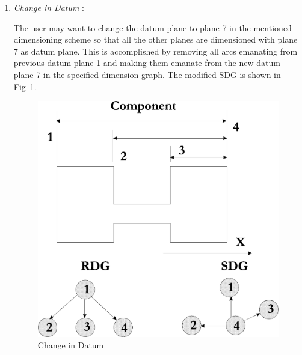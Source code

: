 \begin{enumerate}
                    When the input is given, the two selected primitives are
                    located in the RDG and are checked for connectedness to
                    ensure that a path exists between them. If no such path is
                    found, an error message is issued since the dimension
                    cannot be specified. If a path is found, the value of the
                    dimension is computed by adding (or subtracting)
                    and is checked with the value specified by the
                    user. If this matches, checks are made to see if the
                    modification will lead redundancy in the 
                    dimensioning. If this check is passed,
                    the SDG is modified while the RDG is kept unchanged.
					The modified SDG is shown in Fig.~\ref{ex1dim2}, where
					a new arc is added between nodes 6 and 7 and the arc
					between nodes 1 and 7 is deleted as it would have created
					redundancy represented by a cycle.

		\item

    				{\em Change in Datum} :

    				The user may want to change the datum plane to plane 7
    				in the mentioned dimensioning scheme so that all the other
					planes are dimensioned with plane 7 as datum plane. 
					This is accomplished 
					by removing all arcs emanating from previous datum plane 1
					and making them emanate from the new datum plane 7 in
					the specified dimension graph.
					The modified SDG is shown in Fig~\ref{ex1dim3}.

        \begin{figure}[htbp]
                                        \hspace{4cm}
            \includegraphics[scale=0.5]{CHGDAT.png}
            \caption{Change in Datum}
            \label{ex1dim3}
        \end{figure}


\end{enumerate}
